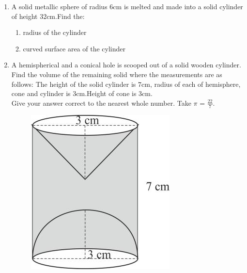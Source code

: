 \begin{enumerate}

\item A solid metallic sphere of radius $6$$\mathrm{cm}$ is melted and made into a solid cylinder of height $32$$\mathrm{cm}$.Find the:
	\begin{enumerate}
		\item radius of the cylinder
		\item curved surface area of the cylinder
	\end{enumerate}

\item A hemispherical and a conical hole is scooped out of a solid wooden cylinder.
Find the volume of the remaining solid where the measurements are as follows:
The height of the solid cylinder is $7\mathrm{cm}$, radius of each of hemisphere, cone and cylinder is $3\mathrm{cm}$.Height of cone is $3\mathrm{cm}$.\\
Give your answer correct to the nearest whole number. Take $\pi$ = $\frac{22}{7}$.

\begin{figure}[!ht]
		\centering
		\includegraphics[width=\columnwidth]{figs/icse2.jpg}
		\caption{}
		\label{fig:enter-label}
	\end{figure}


\end{enumerate}

